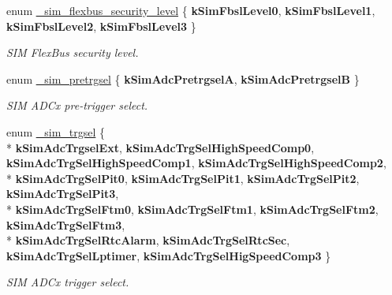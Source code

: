 \begin{DoxyCompactItemize}
\item 
enum \hyperlink{group__sim__hal_ga840826a29859bd88dd2acf9e1512f936}{\+\_\+sim\+\_\+flexbus\+\_\+security\+\_\+level} \{ {\bfseries k\+Sim\+Fbsl\+Level0}, 
{\bfseries k\+Sim\+Fbsl\+Level1}, 
{\bfseries k\+Sim\+Fbsl\+Level2}, 
{\bfseries k\+Sim\+Fbsl\+Level3}
 \}\hypertarget{group__sim__hal_ga840826a29859bd88dd2acf9e1512f936}{}\label{group__sim__hal_ga840826a29859bd88dd2acf9e1512f936}
\begin{DoxyCompactList}\small\item\em S\+IM Flex\+Bus security level. \end{DoxyCompactList}
\item 
enum \hyperlink{group__sim__hal_gae8f567aabf54ce80c9dc4def4ad2fa21}{\+\_\+sim\+\_\+pretrgsel} \{ {\bfseries k\+Sim\+Adc\+PretrgselA}, 
{\bfseries k\+Sim\+Adc\+PretrgselB}
 \}\hypertarget{group__sim__hal_gae8f567aabf54ce80c9dc4def4ad2fa21}{}\label{group__sim__hal_gae8f567aabf54ce80c9dc4def4ad2fa21}
\begin{DoxyCompactList}\small\item\em S\+IM A\+D\+Cx pre-\/trigger select. \end{DoxyCompactList}
\item 
enum \hyperlink{group__sim__hal_ga54baea382a34e3448223fe9625e0d126}{\+\_\+sim\+\_\+trgsel} \{ \\*
{\bfseries k\+Sim\+Adc\+Trgsel\+Ext}, 
{\bfseries k\+Sim\+Adc\+Trg\+Sel\+High\+Speed\+Comp0}, 
{\bfseries k\+Sim\+Adc\+Trg\+Sel\+High\+Speed\+Comp1}, 
{\bfseries k\+Sim\+Adc\+Trg\+Sel\+High\+Speed\+Comp2}, 
\\*
{\bfseries k\+Sim\+Adc\+Trg\+Sel\+Pit0}, 
{\bfseries k\+Sim\+Adc\+Trg\+Sel\+Pit1}, 
{\bfseries k\+Sim\+Adc\+Trg\+Sel\+Pit2}, 
{\bfseries k\+Sim\+Adc\+Trg\+Sel\+Pit3}, 
\\*
{\bfseries k\+Sim\+Adc\+Trg\+Sel\+Ftm0}, 
{\bfseries k\+Sim\+Adc\+Trg\+Sel\+Ftm1}, 
{\bfseries k\+Sim\+Adc\+Trg\+Sel\+Ftm2}, 
{\bfseries k\+Sim\+Adc\+Trg\+Sel\+Ftm3}, 
\\*
{\bfseries k\+Sim\+Adc\+Trg\+Sel\+Rtc\+Alarm}, 
{\bfseries k\+Sim\+Adc\+Trg\+Sel\+Rtc\+Sec}, 
{\bfseries k\+Sim\+Adc\+Trg\+Sel\+Lptimer}, 
{\bfseries k\+Sim\+Adc\+Trg\+Sel\+Hig\+Speed\+Comp3}
 \}\hypertarget{group__sim__hal_ga54baea382a34e3448223fe9625e0d126}{}\label{group__sim__hal_ga54baea382a34e3448223fe9625e0d126}
\begin{DoxyCompactList}\small\item\em S\+IM A\+D\+Cx trigger select. \end{DoxyCompactList}
\item 

\end{DoxyCompactItemize}
